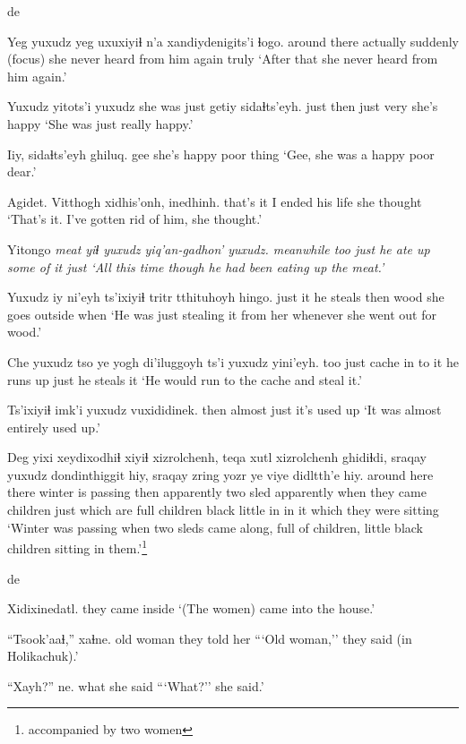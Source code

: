 \documentclass[12pt]{article}
\begin{document}
de

\gll Yeg {yuxudz yeg} uxuxiyiɬ n'a xandiydenigits'i ɬogo.
{around there} actually suddenly {(focus)} {she never heard from him again} {truly}
\glt `After that she never heard from him again.'
\glend

\gll Yuxudz yitots'i yuxudz {she was just} getiy sidaɬts'eyh.
just then just {} very {she's happy}
\glt `She was just really happy.'
\glend

\gll Iiy, sidaɬts'eyh ghiluq.
gee {she's happy} {poor thing}
\glt `Gee, she was a happy poor dear.'
\glend

\gll Agidet. {Vitthogh xidhis'onh,} inedhinh.
{that's it} {I ended his life} {she thought}
\glt `That's it. I've gotten rid of him, she thought.'
\glend

\gll Yitongo \em meat \em yiɬ yuxudz yiq'an-gadhon' yuxudz.
meanwhile {} too just {he ate up some of it} just
\glt `All this time though he had been eating up the meat.'
\glend

\gll Yuxudz iy ni'eyh ts'ixiyiɬ tritr tthituhoyh hingo.
just it {he steals} then wood {she goes outside} when
\glt `He was just stealing it from her whenever she went out for wood.'
\glend

\gll Che yuxudz tso ye yogh di'iluggoyh ts'i yuxudz yini'eyh.
too just cache in {to it} {he runs up} {} just {he steals it}
\glt `He would run to the cache and steal it.'
\glend

\gll Ts'ixiyiɬ imk'i yuxudz vuxididinek.
then almost just {it's used up}
\glt `It was almost entirely used up.'
\glend

\gll Deg yixi xeydixodhiɬ xiyiɬ xizrolchenh, teqa xutl xizrolchenh ghidiɬdi, sraqay yuxudz {dondinthiggit hiy}, sraqay zring yozr ye viye {didltth'e hiy.}
{around here} there {winter is passing} then apparently two sled apparently {when they came} children just {which are full} children black little in {in it} {which they were sitting}
\glt `Winter was passing when two sleds came along, full of children, little black children sitting in them.'\footnote{accompanied by two women}
\glend

de

\gll Xidixinedatl.
{{they came inside}}
\glt `(The women) came into the house.'
\glend

\gll ``Tsook'aaɬ,'' xaɬne.
{old woman} {they told her}
\glt ```Old woman,'' they said (in Holikachuk).'
\glend

\gll ``Xayh?'' ne.
what {she said}
\glt ```What?'' she said.'
\glend
\end{document}

